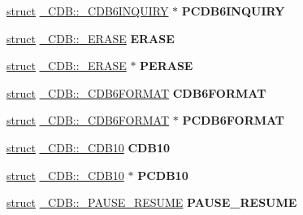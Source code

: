 \begin{DoxyCompactItemize}
\mbox{\label{union___c_d_b_acf0ec456a3c7ef7d0e667ee83920c518}} 
\hyperlink{interfacestruct}{struct} \hyperlink{struct___c_d_b_1_1___c_d_b6_i_n_q_u_i_r_y}{\+\_\+\+C\+D\+B\+::\+\_\+\+C\+D\+B6\+I\+N\+Q\+U\+I\+RY} $\ast$ {\bfseries P\+C\+D\+B6\+I\+N\+Q\+U\+I\+RY}
\item 
\mbox{\label{union___c_d_b_a6da4811febe6fe6e21698b1faba011e2}} 
\hyperlink{interfacestruct}{struct} \hyperlink{struct___c_d_b_1_1___e_r_a_s_e}{\+\_\+\+C\+D\+B\+::\+\_\+\+E\+R\+A\+SE} {\bfseries E\+R\+A\+SE}
\item 
\mbox{\label{union___c_d_b_a550728675a32af4778a91ea5b60c07f0}} 
\hyperlink{interfacestruct}{struct} \hyperlink{struct___c_d_b_1_1___e_r_a_s_e}{\+\_\+\+C\+D\+B\+::\+\_\+\+E\+R\+A\+SE} $\ast$ {\bfseries P\+E\+R\+A\+SE}
\item 
\mbox{\label{union___c_d_b_aa5e4f5698201d899eaa82fc0636310f4}} 
\hyperlink{interfacestruct}{struct} \hyperlink{struct___c_d_b_1_1___c_d_b6_f_o_r_m_a_t}{\+\_\+\+C\+D\+B\+::\+\_\+\+C\+D\+B6\+F\+O\+R\+M\+AT} {\bfseries C\+D\+B6\+F\+O\+R\+M\+AT}
\item 
\mbox{\label{union___c_d_b_a7fc4a887bfc255199b5154060e55ccd8}} 
\hyperlink{interfacestruct}{struct} \hyperlink{struct___c_d_b_1_1___c_d_b6_f_o_r_m_a_t}{\+\_\+\+C\+D\+B\+::\+\_\+\+C\+D\+B6\+F\+O\+R\+M\+AT} $\ast$ {\bfseries P\+C\+D\+B6\+F\+O\+R\+M\+AT}
\item 
\mbox{\label{union___c_d_b_a011b689b1377e3d4a93b84cee020f3c4}} 
\hyperlink{interfacestruct}{struct} \hyperlink{struct___c_d_b_1_1___c_d_b10}{\+\_\+\+C\+D\+B\+::\+\_\+\+C\+D\+B10} {\bfseries C\+D\+B10}
\item 
\mbox{\label{union___c_d_b_a353b1f2ad473066055541064ebed5982}} 
\hyperlink{interfacestruct}{struct} \hyperlink{struct___c_d_b_1_1___c_d_b10}{\+\_\+\+C\+D\+B\+::\+\_\+\+C\+D\+B10} $\ast$ {\bfseries P\+C\+D\+B10}
\item 
\mbox{\label{union___c_d_b_ac6ab750820b9fb7278ada09cb899bca3}} 
\hyperlink{interfacestruct}{struct} \hyperlink{struct___c_d_b_1_1___p_a_u_s_e___r_e_s_u_m_e}{\+\_\+\+C\+D\+B\+::\+\_\+\+P\+A\+U\+S\+E\+\_\+\+R\+E\+S\+U\+ME} {\bfseries P\+A\+U\+S\+E\+\_\+\+R\+E\+S\+U\+ME}

\end{DoxyCompactItemize}
